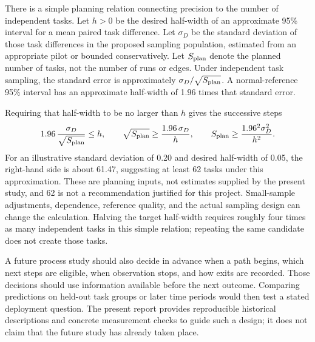 There is a simple planning relation connecting precision to the number of independent tasks. Let $h>0$ be the desired half-width of an approximate 95\% interval for a mean paired task difference. Let $\sigma_D$ be the standard deviation of those task differences in the proposed sampling population, estimated from an appropriate pilot or bounded conservatively. Let $S_{\rm plan}$ denote the planned number of tasks, not the number of runs or edges. Under independent task sampling, the standard error is approximately $\sigma_D/\sqrt{S_{\rm plan}}$. A normal-reference 95\% interval has an approximate half-width of 1.96 times that standard error.

Requiring that half-width to be no larger than $h$ gives the successive steps
\[
1.96\,\frac{\sigma_D}{\sqrt{S_{\rm plan}}}\le h,
\qquad
\sqrt{S_{\rm plan}}\ge\frac{1.96\,\sigma_D}{h},
\qquad
S_{\rm plan}\ge\frac{1.96^2\sigma_D^2}{h^2}.
\]
For an illustrative standard deviation of 0.20 and desired half-width of 0.05, the right-hand side is about 61.47, suggesting at least 62 tasks under this approximation. These are planning inputs, not estimates supplied by the present study, and 62 is not a recommendation justified for this project. Small-sample adjustments, dependence, reference quality, and the actual sampling design can change the calculation. Halving the target half-width requires roughly four times as many independent tasks in this simple relation; repeating the same candidate does not create those tasks.

A future process study should also decide in advance when a path begins, which next steps are eligible, when observation stops, and how exits are recorded. Those decisions should use information available before the next outcome. Comparing predictions on held-out task groups or later time periods would then test a stated deployment question. The present report provides reproducible historical descriptions and concrete measurement checks to guide such a design; it does not claim that the future study has already taken place.
